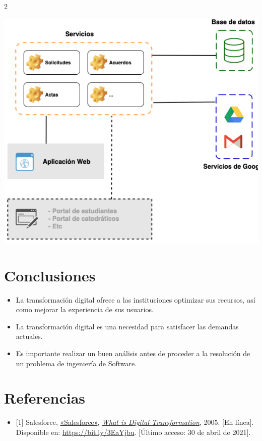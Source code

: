 \documentclass[12pt,spanish,Letterpaper,openany]{book}
\providecommand{\tightlist}{%
  \setlength{\itemsep}{0pt}\setlength{\parskip}{0pt}}
\begin{document}
\begin {multicols}{2}
\begin {flushleft}
\noindent\begin{minipage}[c]{\columnwidth}

\centering

\includegraphics[width=0.75\linewidth]{images/04_02}

\end{minipage}

\end {flushleft}

\hypertarget{conclusiones-2}{%
\section{Conclusiones}\label{conclusiones-2}}

\begin{itemize}
\item
  La transformación digital ofrece a las instituciones optimizar sus recursos, así como mejorar la experiencia de sus usuarios.
\item
  La transformación digital es una necesidad para satisfacer las demandas actuales.
\item
  Es importante realizar un buen análisis antes de proceder a la resolución de un problema de ingeniería de Software.
\end{itemize}

\hypertarget{referencias-3}{%
\section{Referencias}\label{referencias-3}}

\begin{itemize}
\tightlist
\item
  {[}1{]} Salesforce, \href{https://www.wiley.com/en-us}{«Salesforce»}, \href{https://www.ugr.es/~filosofia/recursos/\%20innovacion/convo-2005/trabajo-escrito/como-elaborar-un-articulcientifico.html}{\emph{What is Digital Transformation}}, 2005. {[}En línea{]}. Disponible en: \url{https://bit.ly/3EaYjbu}. {[}Último acceso: 30 de abril de 2021{]}.
\end{itemize}

\end {multicols}
\end{document}
